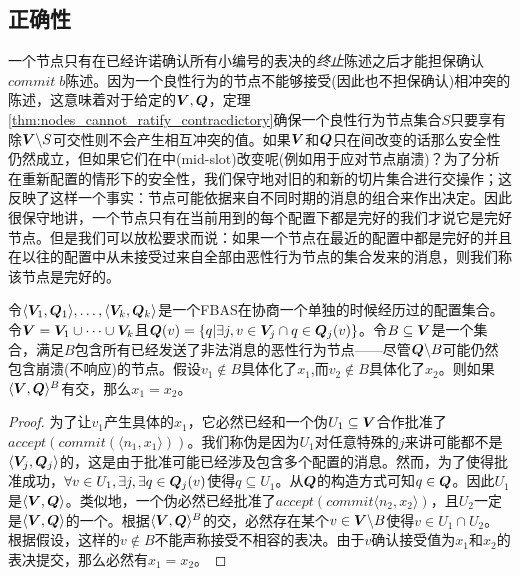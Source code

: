\subsection{正确性}\label{sec:scp_correct}

一个节点只有在已经许诺确认所有小编号的表决的\textit{终止}陈述之后才能担保确认$commit\;b$陈述。因为一个良性行为的节点不能够接受(因此也不担保确认)相冲突的陈述，这意味着对于给定的${\bm V},{\bm Q}$，定理\ref{thm:nodes_cannot_ratify_contracdictory}确保一个良性行为节点集合$S$只要享有除${\bm V}\backslash S${\quorum}可交性则不会产生相互冲突的值。如果${\bm V}$和${\bm Q}$只在{\slot}间改变的话那么安全性仍然成立，但如果它们在{\slot}中(mid-slot)改变呢(例如用于应对节点崩溃)？为了分析在重新配置的情形下的安全性，我们保守地对旧的和新的{\quorum}切片集合进行交操作；这反映了这样一个事实：节点可能依据来自不同时期的消息的组合来作出决定。因此很保守地讲，一个节点只有在当前{\slot}用到的每个配置下都是完好的我们才说它是完好节点。但是我们可以放松要求而说：如果一个节点在最近的配置中都是完好的并且在以往的配置中从未接受过来自全部由恶性行为节点的{\vblock}集合发来的消息，则我们称该节点是完好的。

\begin{theorem}\label{th12}
        令$\langle {\bm V_1},{\bm Q_1}\rangle,\ldots,\langle {\bm V_k},{\bm Q_k}\rangle$是一个FBAS在协商一个单独{\slot}的时候经历过的配置集合。令${\bm V}={\bm V_1}\cup \cdots\cup {\bm V_k}$且${\bm Q}(v)=\left\{q|\exists j, v\in{\bm V_j}\cap q\in{\bm Q}_j(v)\right\}$。令$B\subseteq{\bm V}$是一个集合，满足$B$包含所有已经发送了非法消息的恶性行为节点——尽管${\bm Q}\backslash B$可能仍然包含崩溃(不响应)的节点。假设$v_1\not\in B$具体化了$x_1$,而$v_2\not\in B$具体化了$x_2$。则如果$\langle{\bm V},{\bm Q}\rangle^{B}$有{\quorum}交，那么$x_1=x_2$。
\end{theorem}

\begin{proof}
        为了让$v_1$产生具体的$x_1$，它必然已经和一个伪{\quorum}$U_1\subseteq{\bm V}$合作批准了$accept(commit(\langle n_1,x_1\rangle))$。我们称伪{\quorum}是因为$U_1$对任意特殊的$j$来讲可能都不是$\langle{\bm V}_j,{\bm Q}_j\rangle$的{\quorum}，这是由于批准可能已经涉及包含多个配置的消息。然而，为了使得批准成功，$\forall v\in U_1,\exists j, \exists q\in{\bm Q}_j(v)$使得$q\subseteq U_1$。从${\bm Q}$的构造方式可知$q\in{\bm Q}$。因此$U_1$是$\langle{\bm V},{\bm Q}\rangle$。类似地，一个伪{\quorum}必然已经批准了$accept(commit\langle n_2,x_2\rangle)$，且$U_2$一定是$\langle{\bm V},{\bm Q}\rangle$的一个{\quorum}。根据$\langle{\bm V},{\bm Q}\rangle^{B}$的{\quorum}交，必然存在某个$v\in {\bm V}\backslash B$使得$v\in U_1\cap U_2$。根据假设，这样的$v\not\in B$不能声称接受不相容的表决。由于$v$确认接受值为$x_1$和$x_2$的表决提交，那么必然有$x_1=x_2$。
\end{proof}

